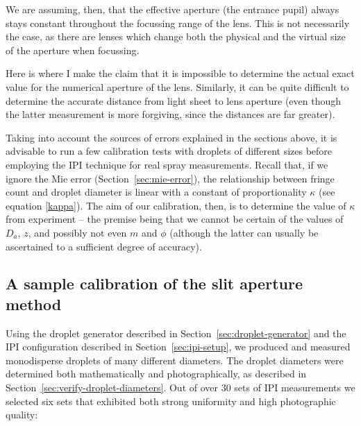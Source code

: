 \documentclass[11.5pt]{book}
\newcommand*{\secref}[1]{Section~\ref{#1}}
\begin{document}
We are assuming, then, that the effective aperture (the entrance pupil) always
stays constant throughout the focussing range of the lens. This is not
necessarily the case, as there are lenses which change both the physical and the
virtual size of the aperture when focussing.

Here is where I make the claim that it is impossible to determine the actual
exact value for the numerical aperture of the lens. Similarly, it can be quite
difficult to determine the accurate distance from light sheet to lens aperture
(even though the latter measurement is more forgiving, since the distances are
far greater).

Taking into account the sources of errors explained in the sections above, it is
advisable to run a few calibration tests with droplets of different sizes before
employing the IPI technique for real spray measurements. Recall that, if we
ignore the Mie error (\secref{sec:mie-error}), the relationship between fringe count and droplet diameter
is linear with a constant of proportionality $\kappa$ (see equation
\eqref{kappa}). The aim of our calibration, then, is to determine the value of
$\kappa$ from experiment -- the premise being that we cannot be certain of the
values of $D_a$, $z$, and possibly not even $m$ and $\phi$ (although the latter
can usually be ascertained to a sufficient degree of accuracy).

\subsection{A sample calibration of the slit aperture method}
Using the droplet generator described in \secref{sec:droplet-generator} and
the IPI configuration described in \secref{sec:ipi-setup}, we produced and
measured monodisperse droplets of many different diameters. The droplet
diameters were determined both mathematically and photographically, as described
in \secref{sec:verify-droplet-diameters}. Out of over 30 sets of IPI
measurements we selected six sets that exhibited both strong uniformity and
high photographic quality:
\end{document}
